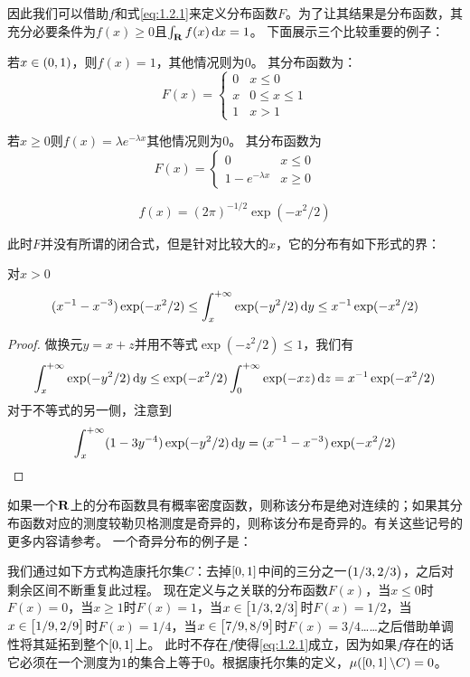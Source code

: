 \documentclass[../main.tex]{subfiles}
\begin{document}
因此我们可以借助\(f\)和式\eqref{eq:1.2.1}来定义分布函数\(F\)。为了让其结果是分布函数，其充分必要条件为\(f(x) \geq 0\)且\(\int_\R f(x) \dif x = 1\)。
下面展示三个比较重要的例子：
\begin{example}
	若\(x \in \intoo{0,1}\)，则\(f(x) = 1\)，其他情况则为\(0\)。
	其分布函数为：
	\[F(x) = \begin{cases}
		0&x\leq 0\\
		x&0\leq x\leq 1\\
		1&x>1
	\end{cases}\]
\end{example}
\begin{example}
	若\(x \geq 0\)则\(f(x) = \lambda e^{-\lambda x}\)其他情况则为\(0\)。
	其分布函数为
	\[F(x) = \begin{cases}
		0&x\leq 0\\
		1-e^{-\lambda x}&x \geq 0
	\end{cases}\]
\end{example}
\begin{example}[标准正态分布]
	\[f(x) = (2\pi)^{-1/2}\exp(-x^2/2)\]
\end{example}
此时\(F\)并没有所谓的闭合式，但是针对比较大的\(x\)，它的分布有如下形式的界：
\begin{theorem} \label{thm:1.2.6}
	对\(x > 0\)
	\[(x^{-1} - x^{-3})\exp(-x^2/2) \leq \int_{x}^{+\infty} \exp(-y^2/2) \dif y \leq x^{-1}\exp(-x^2/2)\]
\end{theorem}
\begin{proof}
	做换元\(y=x+z\)并用不等式\(\exp(-z^2/2) \leq 1\)，我们有
	\[\int_{x}^{+\infty} \exp(-y^2/2) \dif y \leq \exp(-x^2/2)\int_{0}^{+\infty}\exp(-xz) \dif z = x^{-1}\exp(-x^2/2)\]
	对于不等式的另一侧，注意到
	\[\int_{x}^{+\infty} (1-3y^{-4})\exp(-y^2/2) \dif y = (x^{-1} - x^{-3})\exp(-x^2/2)\]
\end{proof}
如果一个\(\mathbf{R}\)上的分布函数具有概率密度函数，则称该分布是绝对连续的；如果其分布函数对应的测度较勒贝格测度是奇异的，则称该分布是奇异的。有关这些记号的更多内容请参考。
一个奇异分布的例子是：
\begin{example}[康托尔集上的均匀分布]\label{ex:1.2.7}
我们通过如下方式构造康托尔集\(C\)：去掉\(\intcc{0,1}\)中间的三分之一\(\intoo{1/3,2/3}\)，之后对剩余区间不断重复此过程。
现在定义与之关联的分布函数\(F(x)\)，当\(x\leq0\)时\(F(x)=0\)，当\(x\geq1\)时\(F(x)=1\)，当\(x\in\intcc{1/3,2/3}\)时\(F(x)=1/2\)，当\(x\in\intcc{1/9,2/9}\)时\(F(x)=1/4\)，当\(x\in\intcc{7/9,8/9}\)时\(F(x)=3/4\)……之后借助单调性将其延拓到整个\(\intcc{0,1}\)上。
此时不存在\(f\)使得\eqref{eq:1.2.1}成立，因为如果\(f\)存在的话它必须在一个测度为\(1\)的集合上等于\(0\)。根据康托尔集的定义，\(\mu(\intcc{0,1}\backslash C)=0\)。
\end{example}
\end{document}
